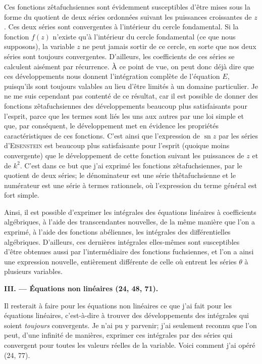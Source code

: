 \documentclass[11pt]{article}
\begin{document}
Ces fonctions zêtafuchsiennes sont évidemment susceptibles d’être mises sous la forme du quotient de deux séries ordonnées suivant les puissances croissantes de $z$. Ces deux séries sont convergentes à l’intérieur du cercle fondamental. Si la fonction $f(z)$ n’existe qu’à l’intérieur du cercle fondamental (ce que nous supposons), la variable $z$ ne peut jamais sortir de ce cercle, en sorte que nos deux séries sont toujours convergentes. D’ailleurs, les coefficients de ces séries se calculent aisément par récurrence. À ce point de vue, on peut donc déjà dire que ces développements nous donnent l’intégration complète de l’équation $E$, puisqu’ils sont toujours valables au lieu d’être limités à un domaine particulier. Je ne me suis cependant pas contenté de ce résultat, car il est possible de donner des fonctions zêtafuchsiennes des développements beaucoup plus satisfaisants pour l’esprit, parce que les termes sont liés les uns aux autres par une loi simple et que, par conséquent, le développement met en évidence les propriétés caractéristiques de ces fonctions. C’est ainsi que l’expression de $\operatorname{sn} z$ par les séries d’\textsc{Eisenstein} est beaucoup plus satisfaisante pour l’esprit (quoique moins convergente) que le développement de cette fonction suivant les puissances de $z$ et de $k^2$. C’est dans ce but que j’ai exprimé les fonctions zêtafuchsiennes, par le quotient de deux séries; le dénominateur est une série thêtafuchsienne et le numérateur est une série à termes rationnels, où l’expression du terme général est fort simple.

Ainsi, il est possible d’exprimer les intégrales des équations linéaires à coefficients algébriques, à l’aide des transcendantes nouvelles, de la même manière que l’on a exprimé, à l’aide des fonctions abéliennes, les intégrales des différentielles algébriques. D’ailleurs, ces dernières intégrales elles-mêmes sont susceptibles d’être obtenues aussi par l’intermédiaire des fonctions fuchsiennes, et l’on a ainsi une expression nouvelle, entièrement différente de celle où entrent les séries $\theta$ à plusieurs variables.

\renewcommand{\thefootnote}{(\arabic{footnote})}
\setcounter{footnote}{0}

\begin{center}
\textbf{III. — Équations non linéaires (24, 48, 71).}
\end{center}

Il resterait à faire pour les équations non linéaires ce que j’ai fait pour les équations linéaires, c’est-à-dire à trouver des développements des intégrales qui soient \emph{toujours} convergents. Je n’ai pu y parvenir; j’ai seulement reconnu que l’on peut, d’une infinité de manières, exprimer ces intégrales par des séries qui convergent pour toutes les valeurs réelles de la variable. Voici comment j’ai opéré (24, 77).
\end{document}
